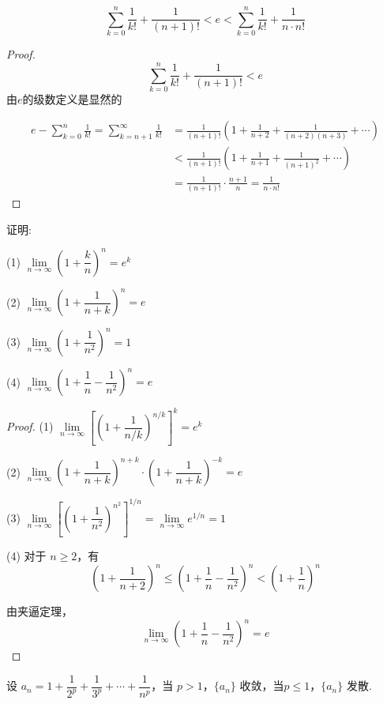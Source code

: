 \begin{corollary}
	$$\sum\limits_{k=0}^{n}\dfrac{1}{k!}+\frac{1}{(n+1)!}<e<\sum\limits_{k=0}^{n}\dfrac{1}{k!}+\frac{1}{n\cdot n!}$$
\end{corollary}
\begin{proof}
	$$\sum\limits_{k=0}^{n}\dfrac{1}{k!}+\frac{1}{(n+1)!}<e$$由$e$的级数定义是显然的
	
	
	$$\begin{aligned}
		e - \sum_{k=0}^n \frac{1}{k!} = \sum_{k=n+1}^\infty \frac{1}{k!} &= \frac{1}{(n+1)!} \left(1 + \frac{1}{n+2} + \frac{1}{(n+2)(n+3)} + \cdots \right)\\
		&< \frac{1}{(n+1)!} \left(1 + \frac{1}{n+1} + \frac{1}{(n+1)^2} + \cdots \right)\\
		&= \frac{1}{(n+1)!} \cdot \frac{n+1}{n} = \frac{1}{n \cdot n!}
	\end{aligned}$$
	
\end{proof}
\begin{example}
	证明:
	
	(1) $\lim\limits_{n \to \infty} \left(1 + \dfrac{k}{n}\right)^n = e^k$
	
	(2) $\lim\limits_{n \to \infty} \left(1 + \dfrac{1}{n + k}\right)^n = e$
	
	(3) $\lim\limits_{n \to \infty} \left(1 + \dfrac{1}{n^2}\right)^n = 1$
	
	(4) $\lim\limits_{n \to \infty} \left(1 + \dfrac{1}{n} - \dfrac{1}{n^2}\right)^n = e$
	
	
\end{example}
\begin{proof}
	
	(1) $\lim\limits_{n \to \infty} \left[\left(1 + \dfrac{1}{n/k}\right)^{n/k}\right]^k = e^k$
	
	(2) $\lim\limits_{n \to \infty} \left(1 + \dfrac{1}{n + k}\right)^{n + k} \cdot \left(1 + \dfrac{1}{n + k}\right)^{-k} = e$
	
	(3) $\lim\limits_{n \to \infty} \left[\left(1 + \dfrac{1}{n^2}\right)^{n^2}\right]^{1/n} = \lim\limits_{n \to \infty} e^{1/n} = 1$
	
	(4) 对于 $n \geqslant 2$，有
	\[
	\left(1 + \frac{1}{n+2}\right)^n \leqslant \left(1 + \frac{1}{n} - \frac{1}{n^2}\right)^n < \left(1 + \frac{1}{n}\right)^n
	\]
	
	由夹逼定理，
	\[
	\lim_{n \to \infty} \left(1 + \frac{1}{n} - \frac{1}{n^2}\right)^n = e
	\]
	
\end{proof}
\begin{proposition}\label{调和级数}
	设 $a_n = 1 + \dfrac{1}{2^p} + \dfrac{1}{3^p} + \cdots + \dfrac{1}{n^p}$，当 $p > 1$，$\{a_n\}$ 收敛，当$p \leqslant 1$，$\{a_n\}$ 发散.
	
	
\end{proposition}
